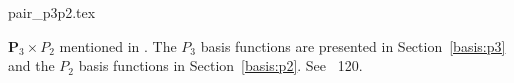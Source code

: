 \begin{flushright} {\tiny {\color{gray} pair\_p3p2.tex}} \end{flushright}

${\bm P}_3\times P_2$ mentioned in \textcite{sten90}.
The $P_3$ basis functions are presented in Section~\ref{basis:p3} and the $P_2$ basis
functions in Section~\ref{basis:p2}.
See \stone~120.
